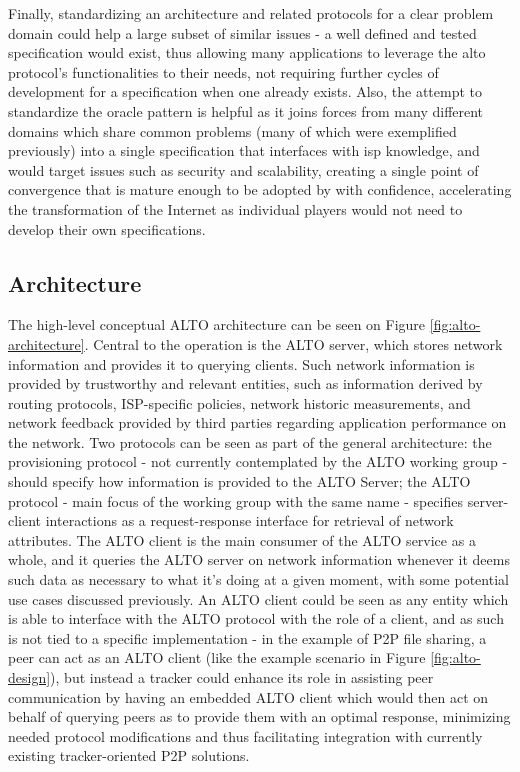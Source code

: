     Finally, standardizing an architecture and related protocols for a clear problem domain could help a large subset of similar issues - a well defined and tested specification would exist, thus allowing many applications to leverage the \gls{alto} protocol's functionalities to their needs, not requiring further cycles of development for a specification when one already exists.
    Also, the attempt to standardize the oracle pattern is helpful as it joins forces from many different domains which share common problems (many of which were exemplified previously) into a single specification that interfaces with \gls{isp} knowledge, and would target issues such as security and scalability, creating a single point of convergence that is mature enough to be adopted by with confidence, accelerating the transformation of the Internet as individual players would not need to develop their own specifications.

\subsection{Architecture}

        The high-level conceptual ALTO architecture can be seen on Figure \ref{fig:alto-architecture}.
        Central to the operation is the ALTO server, which stores network information and provides it to querying clients.
        Such network information is provided by trustworthy and relevant entities, such as information derived by routing protocols, ISP-specific policies, network historic measurements, and network feedback provided by third parties regarding application performance on the network.
        Two protocols can be seen as part of the general architecture: the provisioning protocol - not currently contemplated by the ALTO working group - should specify how information is provided to the ALTO Server; the ALTO protocol - main focus of the working group with the same name - specifies server-client interactions as a request-response interface for retrieval of network attributes.
        The ALTO client is the main consumer of the ALTO service as a whole, and it queries the ALTO server on network information whenever it deems such data as necessary to what it's doing at a given moment, with some potential use cases discussed previously.
        An ALTO client could be seen as any entity which is able to interface with the ALTO protocol with the role of a client, and as such is not tied to a specific implementation - in the example of P2P file sharing, a peer can act as an ALTO client (like the example scenario in Figure \ref{fig:alto-design}), but instead a tracker could enhance its role in assisting peer communication by having an embedded ALTO client which would then act on behalf of querying peers as to provide them with an optimal response, minimizing needed protocol modifications and thus facilitating integration with currently existing tracker-oriented P2P solutions.

